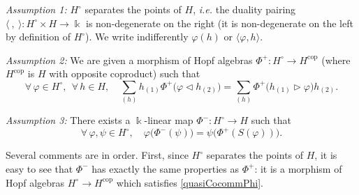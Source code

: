 \documentclass[11pt]{amsart}
\begin{document}
\smallskip

\noindent \textit{Assumption 1:} $H^\circ$ separates the points of $H$, \textit{i.e.} the duality pairing $\langle \: , \: \rangle : H^\circ \times H \to \Bbbk$ is non-degenerate on the right (it is non-degenerate on the left by definition of $H^\circ$). We write indifferently $\varphi(h)$ or $\langle \varphi, h \rangle$.

\smallskip

\noindent \textit{Assumption 2:} We are given a morphism of Hopf algebras $\Phi^+ : H^{\circ} \to H^{\mathrm{cop}}$ (where $H^{\mathrm{cop}}$ is $H$ with opposite coproduct) such that
\begin{equation}\label{quasiCocommPhi}
\forall \, \varphi \in H^{\circ}, \:\: \forall\, h \in H, \quad \sum_{(h)} h_{(1)}\Phi^+\bigl( \varphi \lhd h_{(2)} \bigr) = \sum_{(h)} \Phi^+\bigl( h_{(1)} \rhd \varphi \bigr) h_{(2)}.
\end{equation}

\smallskip

\noindent \textit{Assumption 3:} There exists a $\Bbbk$-linear map $\Phi^- : H^{\circ} \to H$ such that
\begin{equation}\label{PhipmInverses}
\forall \, \varphi, \psi \in H^{\circ}, \quad \varphi\bigl( \Phi^-(\psi) \bigr) = \psi\bigl( \Phi^+(S(\varphi)) \bigr).
\end{equation}

\indent Several comments are in order.  First, since $H^\circ$ separates the points of $H$, it is easy to see that $\Phi^-$ has exactly the same properties as $\Phi^+$: it is a morphism of Hopf algebras $H^{\circ} \to H^{\mathrm{cop}}$ which satisfies \eqref{quasiCocommPhi}.
\end{document}
